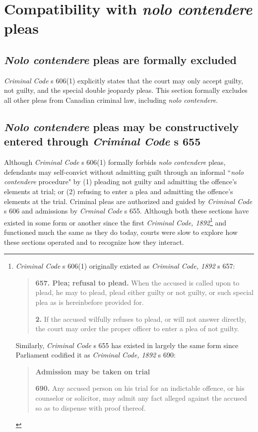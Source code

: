 \section{Compatibility with \textit{nolo contendere} pleas}

\subsection{\textit{Nolo contendere} pleas are formally excluded}

\textit{Criminal Code} s 606(1) explicitly states that the court may only accept guilty, not guilty, and the special double jeopardy pleas. This section formally excludes all other pleas from Canadian criminal law, including \textit{nolo contendere}. 

\subsection{\textit{Nolo contendere} pleas may be constructively entered through \textit{Criminal Code} s 655}

Although \textit{Criminal Code} s 606(1) formally forbids \textit{nolo contendere} pleas, defendants may self-convict without admitting guilt through an informal ``\textit{nolo contendere} procedure" by (1) pleading not guilty and admitting the offence's elements at trial; or (2) refusing to enter a plea and admitting the offence's elements at the trial. Criminal pleas are authorized and guided by \textit{Criminal Code} s 606 and admissions by \textit{Crminal Code} s 655. Although both these sections have existed in some form or another since the first \textit{Criminal Code, 1892}\footnote{\textit{Criminal Code} s 606(1) originally existed as \textit{Criminal Code, 1892} s 657:

\begin{quote}
\textbf{657. Plea; refusal to plead.} When the accused is called upon to plead, he may to plead, plead either guilty or not guilty, or such special plea as is hereinbefore provided for.

\textbf{2.} If the accused wilfully refuses to plead, or will not answer directly, the court may order the proper officer to enter a plea of not guilty. 
\end{quote}

Similarly, \textit{Criminal Code} s 655 has existed in largely the same form since Parliament codified it as \textit{Criminal Code, 1892} s 690:
\begin{quote}
    \textbf{Admission may be taken on trial}
    
    \textbf{690.} Any accused person on his trial for an indictable offence, or his counselor or solicitor, may admit any fact alleged against the accused so as to dispense with proof thereof.
\end{quote}
} and functioned much the same as they do today, courts were slow to explore how these sections operated and to recognize how they interact.

